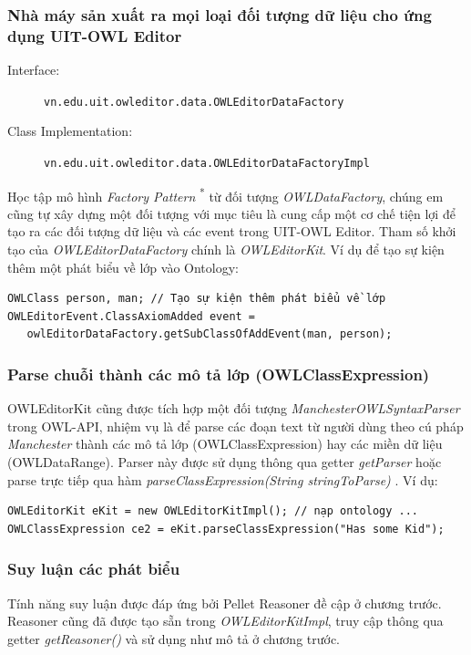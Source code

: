\subsubsection{Nhà máy sản xuất ra mọi loại đối tượng dữ liệu cho ứng dụng UIT-OWL Editor}
{\let\thefootnote\relax{}
}
\begin{description}
\item[Interface:] \verb|vn.edu.uit.owleditor.data.OWLEditorDataFactory|
\item[Class Implementation:] \verb|vn.edu.uit.owleditor.data.OWLEditorDataFactoryImpl|
\end{description}
Học tập mô hình \textit{Factory Pattern} \textsuperscript{*} từ đối tượng \textit{OWLDataFactory}, chúng em cũng tự xây dựng một đối tượng với mục tiêu là cung cấp một cơ chế tiện lợi để tạo ra các đối tượng dữ liệu và các event trong UIT-OWL Editor. Tham số khởi tạo của \textit{OWLEditorDataFactory} chính là \textit{OWLEditorKit}. Ví dụ để tạo sự kiện thêm một phát biểu về lớp vào Ontology:
\begin{verbatim}
OWLClass person, man; // Tạo sự kiện thêm phát biểu về lớp
OWLEditorEvent.ClassAxiomAdded event =
   owlEditorDataFactory.getSubClassOfAddEvent(man, person);
\end{verbatim}

\subsubsection{Parse chuỗi thành các mô tả lớp (OWLClassExpression)}
OWLEditorKit cũng được tích hợp một đối tượng \textit{ManchesterOWLSyntaxParser} trong OWL-API, nhiệm vụ là để parse các đoạn text từ người dùng theo cú pháp \textit{Manchester} thành các mô tả lớp (OWLClassExpression) hay các miền dữ liệu (OWLDataRange). Parser này được sử dụng thông qua getter \textit{getParser} hoặc parse trực tiếp qua hàm \textit{parseClassExpression(String stringToParse)} . Ví dụ:
\begin{verbatim}
OWLEditorKit eKit = new OWLEditorKitImpl(); // nạp ontology ...
OWLClassExpression ce2 = eKit.parseClassExpression("Has some Kid");
\end{verbatim}

\subsubsection{Suy luận các phát biểu}
Tính năng suy luận được đáp ứng bởi Pellet Reasoner đề cập ở chương trước. Reasoner cũng đã được tạo sẵn trong \textit{OWLEditorKitImpl}, truy cập thông qua getter \textit{getReasoner()} và sử dụng như mô tả ở chương trước.

